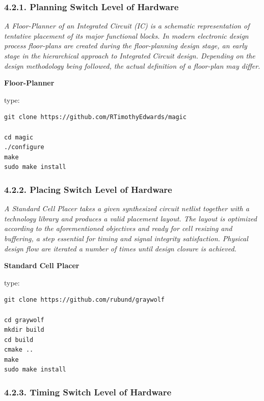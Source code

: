 \documentclass[
]{article}
\begin{document}
\hypertarget{planning-switch-level-of-hardware-1}{%
\subsubsection{4.2.1. Planning Switch Level of
Hardware}\label{planning-switch-level-of-hardware-1}}

\emph{A Floor-Planner of an Integrated Circuit (IC) is a schematic
representation of tentative placement of its major functional blocks. In
modern electronic design process floor-plans are created during the
floor-planning design stage, an early stage in the hierarchical approach
to Integrated Circuit design. Depending on the design methodology being
followed, the actual definition of a floor-plan may differ.}

\textbf{Floor-Planner}

type:

\begin{verbatim}
git clone https://github.com/RTimothyEdwards/magic

cd magic
./configure
make
sudo make install
\end{verbatim}

\hypertarget{placing-switch-level-of-hardware-1}{%
\subsubsection{4.2.2. Placing Switch Level of
Hardware}\label{placing-switch-level-of-hardware-1}}

\emph{A Standard Cell Placer takes a given synthesized circuit netlist
together with a technology library and produces a valid placement
layout. The layout is optimized according to the aforementioned
objectives and ready for cell resizing and buffering, a step essential
for timing and signal integrity satisfaction. Physical design flow are
iterated a number of times until design closure is achieved.}

\textbf{Standard Cell Placer}

type:

\begin{verbatim}
git clone https://github.com/rubund/graywolf

cd graywolf
mkdir build
cd build
cmake ..
make
sudo make install
\end{verbatim}

\hypertarget{timing-switch-level-of-hardware-1}{%
\subsubsection{4.2.3. Timing Switch Level of
Hardware}\label{timing-switch-level-of-hardware-1}}
\end{document}
